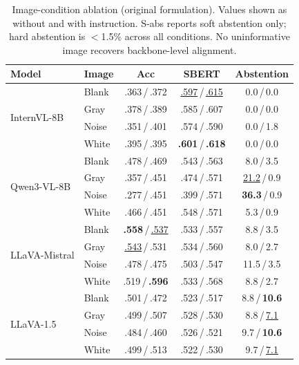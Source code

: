 \documentclass[letterpaper]{article}
\begin{document}
\begin{table}[t]
\centering
\caption{Image-condition ablation (original formulation).
Values shown as without and with instruction.
S-abs reports soft abstention only; hard abstention is $<$1.5\% across all conditions.
No uninformative image recovers backbone-level alignment.}
\label{tab:image_ablation_main}
\small
\setlength{\tabcolsep}{3pt}
\begin{tabular}{llccc}
\toprule
\textbf{Model} & \textbf{Image} & \textbf{Acc} & \textbf{SBERT} & \textbf{Abstention} \\
\midrule
\multirow{4}{*}{InternVL-8B} & Blank & .363\,/\,.372 & \underline{.597}\,/\,\underline{.615} & 0.0\,/\,0.0 \\
 & Gray  & .378\,/\,.389 & .585\,/\,.607 & 0.0\,/\,0.0 \\
 & Noise & .351\,/\,.401 & .574\,/\,.590 & 0.0\,/\,1.8 \\
 & White & .395\,/\,.395 & \textbf{.601}\,/\,\textbf{.618} & 0.0\,/\,0.0 \\
\midrule
\multirow{4}{*}{Qwen3-VL-8B} & Blank & .478\,/\,.469 & .543\,/\,.563 & 8.0\,/\,3.5 \\
 & Gray  & .357\,/\,.451 & .474\,/\,.571 & \underline{21.2}\,/\,0.9 \\
 & Noise & .277\,/\,.451 & .399\,/\,.571 & \textbf{36.3}\,/\,0.9 \\
 & White & .466\,/\,.451 & .548\,/\,.571 & 5.3\,/\,0.9 \\
\midrule
\multirow{4}{*}{LLaVA-Mistral} & Blank & \textbf{.558}\,/\,\underline{.537} & .533\,/\,.557 & 8.8\,/\,3.5 \\
 & Gray  & \underline{.543}\,/\,.531 & .534\,/\,.560 & 8.0\,/\,2.7 \\
 & Noise & .478\,/\,.475 & .503\,/\,.547 & 11.5\,/\,3.5 \\
 & White & .519\,/\,\textbf{.596} & .533\,/\,.568 & 8.8\,/\,2.7 \\
\midrule
\multirow{4}{*}{LLaVA-1.5} & Blank & .501\,/\,.472 & .523\,/\,.517 & 8.8\,/\,\textbf{10.6} \\
 & Gray  & .499\,/\,.507 & .528\,/\,.530 & 8.8\,/\,\underline{7.1} \\
 & Noise & .484\,/\,.460 & .526\,/\,.521 & 9.7\,/\,\textbf{10.6} \\
 & White & .499\,/\,.513 & .522\,/\,.530 & 9.7\,/\,\underline{7.1} \\
\bottomrule
\end{tabular}
\end{table}
\end{document}
